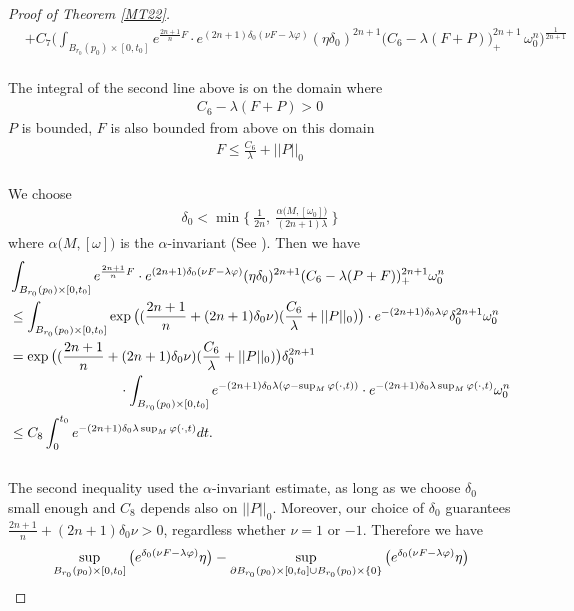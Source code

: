 \documentclass[11pt]{amsart}
\numberwithin{equation}{section}
\begin{document}
\begin{proof}[Proof of Theorem \ref{MT22}]
\begin{align}
		& +C_7\bigg(\int_{B_{r_0}(p_0)\times [0,t_0]}e^{\frac{2n+1}{n}F}\cdot e^{(2n+1)\delta_0(\nu F-\lambda\varphi)} (\eta \delta_0)^{2n+1} \big( C_6- \lambda(F+P)\big)^{2n+1}_+ \,\omega_0^n \bigg)^{\frac{1}{2n+1}}
	\end{align}	\\
	The integral of the second line above is on the domain where 
	\begin{align}
		C_6- \lambda(F+P)>0
	\end{align}
	$P$ is bounded, $F$ is also bounded from above on this domain 
	\begin{align}
		F\le  \frac{C_6}{\lambda}+||P||_0
	\end{align}\\
	 We choose
	\begin{align}
		\delta_0 < \min \{\ \frac{1}{2n} ,\ \frac{\alpha \big(M,[\omega_0]\big)}{(2n+1)\lambda}\  \}
	\end{align}
	where $\alpha \big(M,[\omega]\big)$ is the $\alpha$-invariant (See \cite{tian87}). Then we have  
	\begin{align}
		&\int_{B_{r_0}(p_0)\times [0,t_0]}e^{\frac{2n+1}{n}F}\cdot e^{(2n+1)\delta_0(\nu F-\lambda \varphi)} (\eta\delta_0)^{2n+1}(C_6-\lambda(P+F))_+^{2n+1} \omega_0^n \notag \\
		&\le  \int_{B_{r_0}(p_0)\times [0,t_0]}\exp\big((\frac{2n+1}{n}+(2n+1)\delta_0\nu)(\frac{C_6}{\lambda}+||P||_0)\big)\cdot e^{-(2n+1)\delta_0\lambda\varphi}\delta_0^{2n+1}\omega_0^n \notag \\
		&=\exp\big((\frac{2n+1}{n}+(2n+1)\delta_0\nu)(\frac{C_6}{\lambda}+||P||_0)\big)\delta_0^{2n+1} \notag \\
		&\qquad\qquad\qquad\qquad  \cdot\int_{B_{r_0}(p_0)\times [0,t_0]}e^{-(2n+1)\delta_0\lambda(\varphi-\sup_M\varphi(\cdot,t))}\cdot e^{-(2n+1)\delta_0\lambda \sup_M\varphi(\cdot,t)}\omega_0^n \notag \\
		&\le  C_8\int_0^{t_0}e^{-(2n+1)\delta_0\lambda\sup_M\varphi(\cdot,t)}dt.
	\end{align} \\
	The second inequality used the $\alpha$-invariant estimate, as long as we choose $\delta_0$ small enough and $C_8$ depends also on $||P||_0$. Moreover,  our choice of $\delta_0$ guarantees $\frac{2n+1}{n}+(2n+1)\delta_0\nu>0$,  regardless whether $\nu=1$ or $-1$. Therefore we have 
	\begin{align}
		& \sup_{B_{r_0}(p_0)\times [0,t_0]}\big(e^{\delta_0(\nu F-\lambda\varphi)}\eta\big) - \sup_{\partial B_{r_0}(p_0)\times [0,t_0] \cup B_{r_0}(p_0)\times \{0\}}\big( e^{\delta_0(\nu F-\lambda\varphi)}\eta \big) \notag\\

\end{align}
\end{proof}
\end{document}

